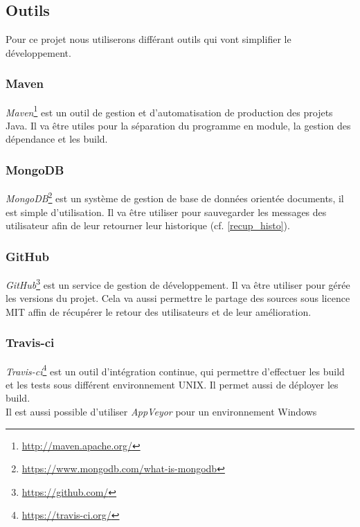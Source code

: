 \documentclass[12pt]{article}
\begin{document}
\subsection{Outils}
Pour ce projet nous utiliserons différant outils qui vont simplifier le développement.

\subsubsection{Maven}
\textit{Maven}\footnote{\url{http://maven.apache.org/}} est un outil de gestion et d'automatisation de production des projets Java. Il va être utiles pour la séparation du programme en module, la gestion des dépendance et les build.

\subsubsection{MongoDB}
\textit{MongoDB}\footnote{\url{https://www.mongodb.com/what-is-mongodb}} est un système de gestion de base de données orientée documents, il est simple d'utilisation. Il va être utiliser pour sauvegarder les messages des utilisateur afin de leur retourner leur historique (cf. \ref{recup_histo}).

\subsubsection{GitHub}
\textit{GitHub}\footnote{\url{https://github.com/}} est un service de gestion de développement. Il va être utiliser pour gérée les versions du projet. Cela va aussi permettre le partage des sources sous licence MIT affin de récupérer le retour des utilisateurs et de leur amélioration.

\subsubsection{Travis-ci}
\textit{Travis-ci}\footnote{\url{https://travis-ci.org/}} est un outil d'intégration continue, qui permettre d'effectuer les build et les tests sous différent environnement UNIX. Il permet aussi de déployer les build.\\
Il est aussi possible d'utiliser \textit{AppVeyor} pour un environnement Windows 




\end{document}
